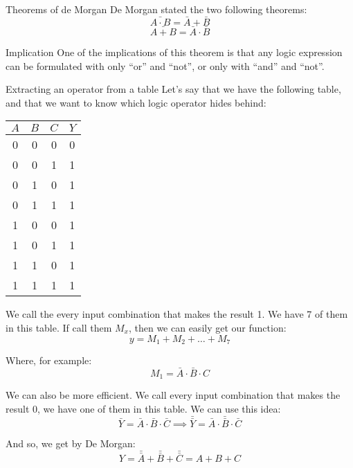 \documentclass[a4paper]{article}
\begin{document}
\begin{parag}{Theorems of de Morgan}
    De Morgan stated the two following theorems: 
    \[\bar{A \cdot B} = \bar{A} + \bar{B}\]
    \[\bar{A + B} = \bar{A} \cdot \bar{B}\]
    
    \begin{subparag}{Implication}
        One of the implications of this theorem is that any logic expression can be formulated with only ``or'' and ``not'', or only with ``and'' and ``not''.
    \end{subparag}
\end{parag}

\begin{parag}{Extracting an operator from a table}
    Let's say that we have the following table, and that we want to know which logic operator hides behind:
    \begin{center}
        \begin{tabular}{c|c|c|c}
            $A$ & $B$ & $C$ & $Y$ \\
            \hline
            0 & 0 & 0 & 0 \\
            0 & 0 & 1 & 1 \\
            0 & 1 & 0 & 1 \\
            0 & 1 & 1 & 1 \\
            1 & 0 & 0 & 1 \\
            1 & 0 & 1 & 1 \\
            1 & 1 & 0 & 1 \\
            1 & 1 & 1 & 1 \\
        \end{tabular}
    \end{center}
    

    We call the  every input combination that makes the result 1. We have 7 of them in this table. If call them $M_x$, then we can easily get our function: 
    \[y = M_1 + M_2 + \ldots + M_7\]

    Where, for example: 
    \[M_1 = \bar{A}\cdot \bar{B}\cdot C\]
    
    We can also be more efficient. We call  every input combination that makes the result 0, we have one of them in this table. We can use this idea: 
    \[\bar{Y} = \bar{A} \cdot \bar{B} \cdot \bar{C} \implies \bar{\bar{Y}} = \bar{\bar{A} \cdot \bar{B} \cdot \bar{C}}\]
    
    And so, we get by De Morgan: 
    \[Y = \bar{\bar{A}} + \bar{\bar{B}} + \bar{\bar{C}} = A + B + C\]
\end{parag}
\end{document}
